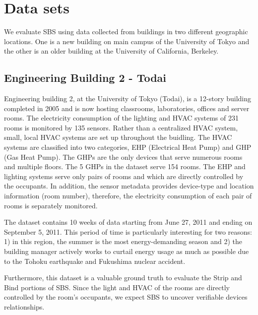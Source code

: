 \section{Data sets}
We evaluate SBS using data collected from buildings in two different geographic locations.  
One is a new building on main campus of the University of Tokyo and the other is an older building at 
the University of California, Berkeley.

\subsection{Engineering Building 2 - Todai}\label{data:engbldg2}
Engineering building 2, at the University of Tokyo (Todai), is a 12-story building completed in 2005 and is now 
hosting classrooms, laboratories, offices 
and server rooms.  
The electricity consumption of the lighting and HVAC systems of 231 rooms is monitored by 135 sensors.
Rather than a centralized HVAC system, small, local HVAC systems are set up throughout the buidling.  
The HVAC systems are classified into two categories, EHP (Electrical Heat Pump) and GHP (Gas Heat Pump).
The GHPs are the only devices that serve numerous rooms and multiple floors.  The 5 GHPs in the dataset serve 154 rooms.
The EHP and lighting systems serve only pairs of rooms and which are directly controlled by the occupants.
In addition, the sensor metadata provides device-type and location information (room number), 
therefore, the electricity consumption of each pair of rooms is separately monitored.

The dataset contains 10 weeks of data starting from June 27, 2011 and ending on September 5, 2011.
This period of time is particularly interesting for two reasons: 1) in this region, the summer is the most energy-demanding 
season and 2) the building manager actively works to curtail energy usage as much as possible due to the 
Tohoku earthquake and Fukushima nuclear accident.

Furthermore, this dataset is a valuable ground truth to evaluate the Strip and Bind portions of SBS.
Since the light and HVAC of the rooms are directly controlled by the room's occupants, we expect SBS to uncover verifiable devices 
relationships.  

